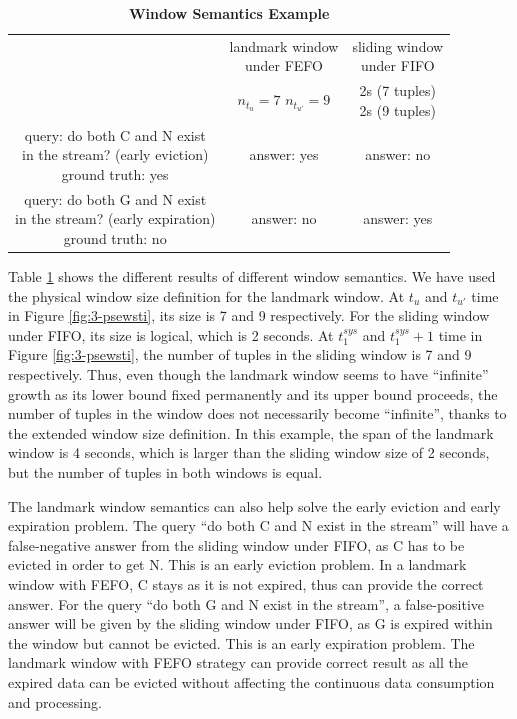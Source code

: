 \begin{table}[!htbp]
	\centering
	\caption{\textbf{Window Semantics Example}}
	\label{tab:lwsw}
	\begin{tabular}{|c||c|c|}
	\hline
	& \makecell{landmark window \\ under FEFO} & \makecell{sliding window \\ under FIFO} \\ \hhline{|=#=|=|}
	\makecell{window size} & \makecell{$n_{t_{u}} = 7$\\ $n_{t_{u'}} = 9$} & \makecell{2s (7 tuples)\\ 2s (9 tuples)} \\ \hline
	\makecell{query: do both C and N exist \\ in the stream? (early eviction) \\ ground truth: yes } & answer: yes  & answer: no \\ \hline
	\makecell{query: do both G and N exist \\ in the stream? (early expiration) \\ ground truth: no} & answer: no & answer: yes \\ \hline
	\end{tabular}
\end{table}

Table \ref{tab:lwsw} shows the different results of different window semantics. 
We have used the physical window size definition for the landmark window. 
At $t_{u}$ and $t_{u'}$ time in Figure \ref{fig:3-psewsti}, its size is 7 and 9 respectively. 
For the sliding window under FIFO, its size is logical, which is 2 seconds. 
At $t_{1}^{sys}$ and $t_{1}^{sys} + 1$ time in Figure \ref{fig:3-psewsti}, the number of tuples in the sliding window is 7 and 9 respectively.
Thus, even though the landmark window seems to have ``infinite'' growth as its lower bound fixed permanently and its upper bound proceeds, the number of tuples in the window does not necessarily become ``infinite'', thanks to the extended window size definition. 
In this example, the span of the landmark window is 4 seconds, which is larger than the sliding window size of 2 seconds, but the number of tuples in both windows is equal.

The landmark window semantics can also help solve the early eviction and early expiration problem. 
The query ``do both C and N exist in the stream'' will have a false-negative answer from the sliding window under FIFO, as C has to be evicted in order to get N. 
This is an early eviction problem.
In a landmark window with FEFO, C stays as it is not expired, thus can provide the correct answer. 
For the query ``do both G and N exist in the stream'', a false-positive answer will be given by the sliding window under FIFO, as G is expired within the window but cannot be evicted. 
This is an early expiration problem.
The landmark window with FEFO strategy can provide correct result as all the expired data can be evicted without affecting the continuous data consumption and processing.  
%
